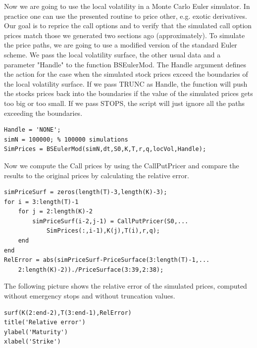 \begin{par}
Now we are going to use the local volatility in a Monte Carlo Euler simulator. In practice one can use the presented routine to price other, e.g. exotic derivatives. Our goal is to reprice the call options and to verify that the simulated call option prices match those we generated two sections ago (approximately). To simulate the price paths, we are going to use a modified version of the standard Euler scheme. We pass the local volatility surface, the other usual data and a parameter "Handle" to the function BSEulerMod. The Handle argument defines the action for the case when the simulated stock prices exceed the boundaries of the local volatility surface. If we pass TRUNC as Handle, the function will push the stocks prices back into the boundaries if the value of the simulated prices gets too big or too small. If we pass STOPS, the script will just ignore all the paths exceeding the boundaries.
\end{par} \vspace{1em}
\begin{verbatim}
Handle = 'NONE';
simN = 100000; % 100000 simulations
SimPrices = BSEulerMod(simN,dt,S0,K,T,r,q,locVol,Handle);
\end{verbatim}
\begin{par}
Now we compute the Call prices by using the CallPutPricer and compare the results to the original prices by calculating the relative error.
\end{par} \vspace{1em}
\begin{verbatim}
simPriceSurf = zeros(length(T)-3,length(K)-3);
for i = 3:length(T)-1
    for j = 2:length(K)-2
        simPriceSurf(i-2,j-1) = CallPutPricer(S0,...
        	SimPrices(:,i-1),K(j),T(i),r,q);
    end
end
RelError = abs(simPriceSurf-PriceSurface(3:length(T)-1,...
	2:length(K)-2))./PriceSurface(3:39,2:38);
\end{verbatim}
\begin{par}
The following picture shows the relative error of the simulated prices, computed without emergency stops and without truncation values.
\end{par} \vspace{1em}
\begin{verbatim}
surf(K(2:end-2),T(3:end-1),RelError)
title('Relative error')
ylabel('Maturity')
xlabel('Strike')
\end{verbatim}

